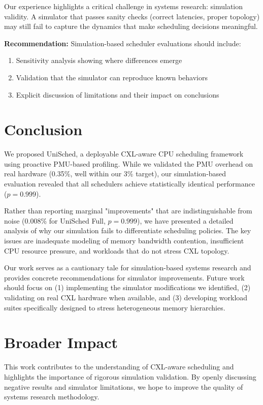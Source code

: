 \documentclass[11pt]{article}
\begin{document}
Our experience highlights a critical challenge in systems research: simulation validity. A simulator that passes sanity checks (correct latencies, proper topology) may still fail to capture the dynamics that make scheduling decisions meaningful.

\textbf{Recommendation:} Simulation-based scheduler evaluations should include:
\begin{enumerate}
    \item Sensitivity analysis showing where differences emerge
    \item Validation that the simulator can reproduce known behaviors
    \item Explicit discussion of limitations and their impact on conclusions
\end{enumerate}

\section{Conclusion}

We proposed UniSched, a deployable CXL-aware CPU scheduling framework using proactive PMU-based profiling. While we validated the PMU overhead on real hardware (0.35\%, well within our 3\% target), our simulation-based evaluation revealed that all schedulers achieve statistically identical performance ($p=0.999$).

Rather than reporting marginal "improvements" that are indistinguishable from noise (0.008\% for UniSched Full, $p=0.999$), we have presented a detailed analysis of why our simulation fails to differentiate scheduling policies. The key issues are inadequate modeling of memory bandwidth contention, insufficient CPU resource pressure, and workloads that do not stress CXL topology.

Our work serves as a cautionary tale for simulation-based systems research and provides concrete recommendations for simulator improvements. Future work should focus on (1) implementing the simulator modifications we identified, (2) validating on real CXL hardware when available, and (3) developing workload suites specifically designed to stress heterogeneous memory hierarchies.

\section*{Broader Impact}

This work contributes to the understanding of CXL-aware scheduling and highlights the importance of rigorous simulation validation. By openly discussing negative results and simulator limitations, we hope to improve the quality of systems research methodology.
\end{document}
